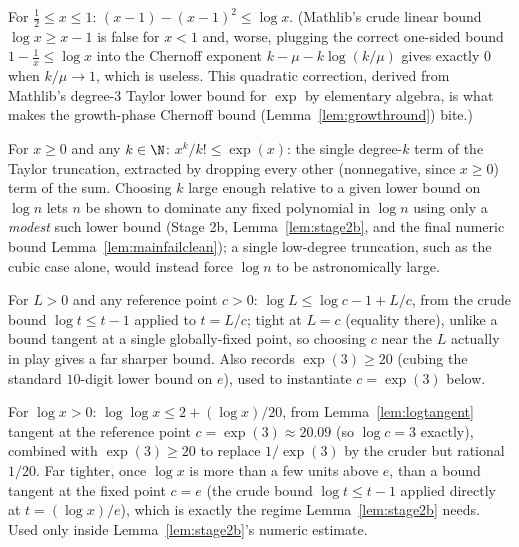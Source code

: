\begin{lemma}\label{lem:logquad}
  \leanok
  For $\tfrac12 \le x \le 1$: $(x-1)-(x-1)^2 \le \log x$. (Mathlib's crude
  linear bound $\log x \ge x-1$ is false for $x<1$ and, worse, plugging the
  correct one-sided bound $1-\tfrac1x\le\log x$ into the Chernoff exponent
  $k-\mu-k\log(k/\mu)$ gives exactly $0$ when $k/\mu\to1$, which is useless. This
  quadratic correction, derived from Mathlib's degree-$3$ Taylor lower bound
  for $\exp$ by elementary algebra, is what makes the growth-phase Chernoff
  bound (Lemma~\ref{lem:growthround}) bite.)
\end{lemma}

\begin{lemma}\label{lem:exppow}
  \leanok
  For $x\ge0$ and any $k\in\N$: $x^k/k! \le \exp(x)$: the single
  degree-$k$ term of the Taylor truncation, extracted by dropping every
  other (nonnegative, since $x\ge0$) term of the sum. Choosing $k$ large enough relative to a given
  lower bound on $\log n$ lets $n$ be shown to dominate any fixed
  polynomial in $\log n$ using only a \emph{modest} such lower bound
  (Stage 2b, Lemma~\ref{lem:stage2b}, and the final numeric bound
  Lemma~\ref{lem:mainfailclean}); a single low-degree truncation, such
  as the cubic case alone, would instead force $\log n$ to be
  astronomically large.
\end{lemma}

\begin{lemma}\label{lem:logtangent}
  \leanok
  For $L>0$ and any reference point $c>0$: $\log L \le \log c - 1 + L/c$,
  from the crude bound $\log t \le t - 1$ applied to $t = L/c$; tight at
  $L=c$ (equality there), unlike a bound tangent at a single globally-fixed
  point, so choosing $c$ near the $L$ actually in play gives a far sharper
  bound. Also records $\exp(3)\ge20$ (cubing the standard $10$-digit lower
  bound on $e$), used to instantiate $c=\exp(3)$ below.
\end{lemma}

\begin{lemma}\label{lem:loglog}
  \leanok
  For $\log x>0$: $\log\log x \le 2 + (\log x)/20$, from
  Lemma~\ref{lem:logtangent} tangent at the reference point
  $c=\exp(3)\approx20.09$ (so $\log c = 3$ exactly), combined with
  $\exp(3)\ge20$ to replace $1/\exp(3)$ by the cruder but rational $1/20$.
  Far tighter, once $\log x$ is more than a few units above $e$, than a
  bound tangent at the fixed point $c=e$ (the crude bound $\log t\le t-1$
  applied directly at $t=(\log x)/e$), which is exactly the regime
  Lemma~\ref{lem:stage2b} needs. Used only inside Lemma~\ref{lem:stage2b}'s
  numeric estimate.
\end{lemma}

